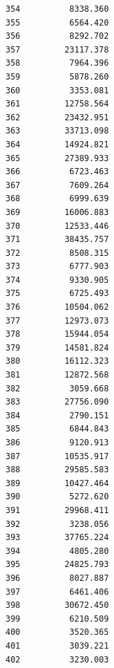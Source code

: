 \documentclass[
  letterpaper,
  DIV=11,
  numbers=noendperiod]{scrartcl}
\begin{document}
\begin{verbatim}
354          8338.360
355          6564.420
356          8292.702
357         23117.378
358          7964.396
359          5878.260
360          3353.081
361         12758.564
362         23432.951
363         33713.098
364         14924.821
365         27389.933
366          6723.463
367          7609.264
368          6999.639
369         16006.883
370         12533.446
371         38435.757
372          8508.315
373          6777.903
374          9330.905
375          6725.493
376         10504.062
377         12973.073
378         15944.054
379         14581.824
380         16112.323
381         12872.568
382          3059.668
383         27756.090
384          2790.151
385          6844.843
386          9120.913
387         10535.917
388         29585.583
389         10427.464
390          5272.620
391         29968.411
392          3238.056
393         37765.224
394          4805.280
395         24825.793
396          8027.887
397          6461.406
398         30672.450
399          6210.509
400          3520.365
401          3039.221
402          3230.003
\end{verbatim}
\end{document}
